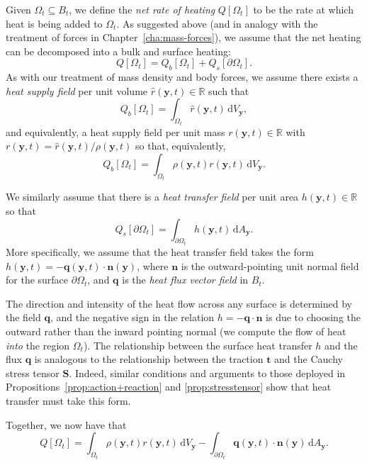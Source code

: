 \documentclass[
  letterpaper,
  DIV=11,
  numbers=noendperiod]{scrreprt}
\theoremstyle{plain}
\theoremstyle{remark}
\begin{document}
Given \(\Omega_t\subseteq B_t\), we define the \emph{net rate of
heating} \(Q[\Omega_t]\) to be the rate at which heat is being added to
\(\Omega_t\). As suggested above (and in analogy with the treatment of
forces in Chapter~\hyperref[cha:mass-forces]{{[}cha:mass-forces{]}}), we
assume that the net heating can be decomposed into a bulk and surface
heating: \[Q[\Omega_t] = Q_b[\Omega_t]+Q_s[\partial\Omega_t].\] As with
our treatment of mass density and body forces, we assume there exists a
\emph{heat supply field} per unit volume
\(\hat{r}({\boldsymbol{y}},t)\in{\mathbb{R}}\) such that
\[Q_b[\Omega_t] = \int_{\Omega_t}\hat{r}({\boldsymbol{y}},t){\,{\mathrm{d}}V_{{\boldsymbol{y}}}},\]
and equivalently, a heat supply field per unit mass
\(r({\boldsymbol{y}},t)\in{\mathbb{R}}\) with
\(r({\boldsymbol{y}},t) = \hat{r}({\boldsymbol{y}},t)/\rho({\boldsymbol{y}},t)\)
so that, equivalently,
\[Q_b[\Omega_t] = \int_{\Omega_t}\rho({\boldsymbol{y}},t)r({\boldsymbol{y}},t){\,{\mathrm{d}}V_{{\boldsymbol{y}}}}.\]

We similarly assume that there is a \emph{heat transfer field} per unit
area \(h({\boldsymbol{y}},t)\in{\mathbb{R}}\) so that
\[Q_s[\partial\Omega_t] = \int_{\partial \Omega_t} h({\boldsymbol{y}},t){\,{\mathrm{d}}A_{{\boldsymbol{y}}}}.\]
More specifically, we assume that the heat transfer field takes the form
\(h({\boldsymbol{y}},t) = -{\boldsymbol{q}}({\boldsymbol{y}},t)\cdot{\boldsymbol{n}}({\boldsymbol{y}})\),
where \({\boldsymbol{n}}\) is the outward-pointing unit normal field for
the surface \(\partial\Omega_t\), and \({\boldsymbol{q}}\) is the
\emph{heat flux vector field} in \(B_t\).

The direction and intensity of the heat flow across any surface is
determined by the field \({\boldsymbol{q}}\), and the negative sign in
the relation \(h=-{\boldsymbol{q}}\cdot{\boldsymbol{n}}\) is due to
choosing the outward rather than the inward pointing normal (we compute
the flow of heat \emph{into} the region \(\Omega_t\)). The relationship
between the surface heat transfer \(h\) and the flux
\({\boldsymbol{q}}\) is analogous to the relationship between the
traction \({\boldsymbol{t}}\) and the Cauchy stress tensor
\({\boldsymbol{S}}\). Indeed, similar conditions and arguments to those
deployed in
Propositions~\hyperref[prop:action+reaction]{{[}prop:action+reaction{]}}
and \hyperref[prop:stresstensor]{{[}prop:stresstensor{]}} show that heat
transfer must take this form.

Together, we now have that
\[Q[\Omega_t] = \int_{\Omega_t}\rho({\boldsymbol{y}},t)r({\boldsymbol{y}},t){\,{\mathrm{d}}V_{{\boldsymbol{y}}}}-\int_{\partial \Omega_t}{\boldsymbol{q}}({\boldsymbol{y}},t)\cdot{\boldsymbol{n}}({\boldsymbol{y}}){\,{\mathrm{d}}A_{{\boldsymbol{y}}}}.\]
\end{document}

